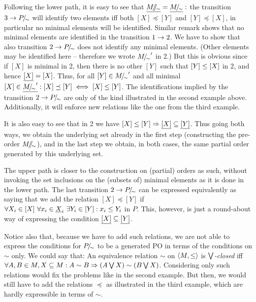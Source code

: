 \begin{Proof}
Following the lower path, it is easy to see that $\underline {M\!{\textstyle /}\!\!{\textstyle /}\!_\sim}=\underline {M\!{\textstyle /}\!_\sim}:$ the transition $3\rightarrow P\!{\textstyle /}\!_\sim$ will
identify two elements iff both $[X]\preceq [Y]$ and $[Y]\preceq [X]$,
in particular no minimal elements will be identified.  Similar remark
shows that no minimal elements are identified in the transition
$1\rightarrow 2$. We have to show that also transition $2\rightarrow P\!{\textstyle /}\!_\sim$
does not identify any minimal elements. (Other elements may be
identified here -- therefore we wrote ${M\!{\textstyle /}\!_\sim}'$ in 2.) But this
is obvious since if $[X]$ is minimal in 2, then there is no other
$[Y]$ such that $[Y]\leq [X]$ in 2, and hence $\underline {[X]}=[X]$. Thus,
for all $[Y]\in{M\!{\textstyle /}\!_\sim}'$ and all minimal $[X]\in\underline {{M\!{\textstyle /}\!_\sim}'}: [X]\preceq [Y]\iff [X]\leq[Y]$. The identifications implied
by the transition $2\rightarrow P\!{\textstyle /}\!_\sim$ are only of the kind
illustrated in the second example above. Additionally, it will enforce
new relations like the one from the third example.

It is also easy to see that in 2 we have $[X]\leq [Y]\Rightarrow
\underline {[X]}\subseteq\underline {[Y]}$. Thus going both ways, we obtain the underlying set already in the first step (constructing the pre-order $M\!{\textstyle /}\!\!{\textstyle /}\!_\sim$), and in the last step we obtain, in both cases, the same partial order generated by this underlying set.
\end{Proof}

The upper path is closer to the construction on (partial) orders as
such, without invoking the set inclusions on the (subsets of) minimal
elements as it is done in the lower path. The last transition $2\rightarrow
P\!{\textstyle /}\!_\sim$ can be expressed equivalently as saying that we add the
relation $[X]\preceq [Y]$ if $\forall X_i\in[X]\ \forall x_i\in\underline {X}_i\ \exists Y_i\in[Y]: x_i\leq Y_i$ in $P$. This, however, is just a
round-about way of expressing the condition
$\underline {[X]}\subseteq\underline {[Y]}$.

Notice also that, because we have to add such relations, we are not
able to express the conditions for $P\!{\textstyle /}\!_\sim$ to be a generated PO
in terms of the conditions on $\sim$ only.  We could say that: 
An equivalence relation $\sim$ on  $\langle M,\leq\rangle$ is {\em
$\bigvee$-closed} iff $\forall A,B\in M, X\subseteq M : A\sim B \Rightarrow
(A\bigvee X)\sim (B\bigvee X)$. 
Considering only such relations
would fix the problems like in the second example. But then, we would
still have to add the relations $\preceq$ as illustrated in the third
example, which are hardly expressible in terms of $\sim$.

